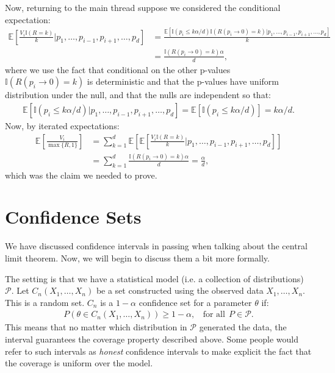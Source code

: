 \documentclass[twoside,12pt]{article}
\begin{document}
Now, returning to the main thread suppose we considered the conditional expectation:
\begin{align*}
\mathbb{E}\left[\frac{V_i \mathbb{I}(R = k)}{k} \Big\vert p_1,\ldots,p_{i-1},p_{i+1},\ldots, p_d\right] &=
\frac{ \mathbb{E}[ \mathbb{I}(p_i \leq k\alpha/d) \mathbb{I}(R(p_i \rightarrow 0) = k) |  p_1,\ldots,p_{i-1},p_{i+1},\ldots, p_d] } {k} \\
&= \frac{\mathbb{I}(R(p_i \rightarrow 0) = k) \alpha}{ d},
\end{align*}
where we use the fact that conditional on the other p-values $\mathbb{I}(R(p_i \rightarrow 0) = k)$ is deterministic and that the p-values have uniform distribution under the null, and that the nulls are independent so that:
\begin{align*}
\mathbb{E}[\mathbb{I}(p_i \leq k\alpha/d) |  p_1,\ldots,p_{i-1},p_{i+1},\ldots, p_d] = \mathbb{E}[ \mathbb{I}(p_i \leq k\alpha/d)] = k \alpha/d.
\end{align*}
Now, by iterated expectations:
\begin{align*}
\mathbb{E}\left[ \frac{V_i}{\max\{R,1\}}\right] &= 
\sum_{k=1}^d 
\mathbb{E} \left[\mathbb{E}\left[  \frac{V_i \mathbb{I}(R = k)}{k}\Big\vert p_1,\ldots,p_{i-1},p_{i+1},\ldots, p_d\right]\right] \\
&= \sum_{k=1}^d  \frac{\mathbb{I}(R(p_i \rightarrow 0) = k) \alpha}{ d} = \frac{\alpha}{d},
\end{align*}
which was the claim we needed to prove.

\section{Confidence Sets}
We have discussed confidence intervals in passing when talking about the central limit theorem. Now, we will begin to discuss them a bit more formally.

The setting is that we have a statistical model (i.e. a collection of distributions) $\mathcal{P}$. Let
$C_n(X_1,\ldots,X_n)$ be a set constructed using the observed data $X_1,\ldots,X_n$. This is a random set. $C_n$ is a $1 - \alpha$ confidence set for a parameter $\theta$ if:
\begin{align*}
P(\theta \in C_n(X_1,\ldots,X_n)) \geq 1 - \alpha,~~~~\text{for all}~~P \in \mathcal{P}.
\end{align*}
This means that no matter which distribution in $\mathcal{P}$ generated the data, the interval guarantees the coverage property described above. Some people would refer to such intervals as \emph{honest} confidence intervals to make explicit the fact that the coverage is uniform over the model.
\end{document}
